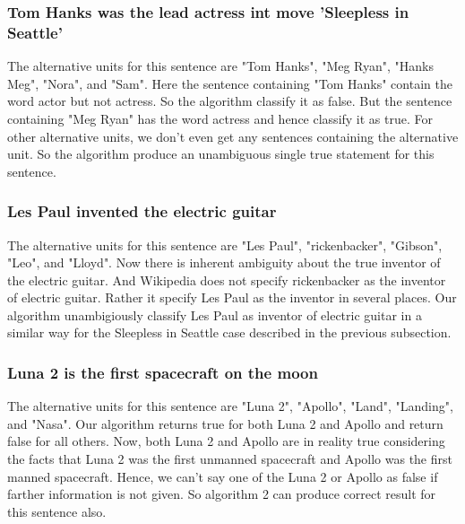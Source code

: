 \documentclass[11pt]{article}
\begin{document}
\subsubsection{Tom Hanks was the lead actress  int move 'Sleepless in Seattle'}
The alternative units for this sentence are "Tom Hanks", "Meg Ryan", "Hanks Meg", "Nora", and "Sam". Here the sentence containing "Tom Hanks" contain the word actor but not actress. So the algorithm classify it as false. But the sentence containing "Meg Ryan" has the word actress and hence classify it as true. For other alternative units, we don't even get any sentences containing the alternative unit. So the algorithm produce an unambiguous single true statement for this sentence.

\subsubsection{Les Paul invented the electric guitar}
The alternative units for this sentence are "Les Paul", "rickenbacker", "Gibson", "Leo", and "Lloyd". Now there is inherent ambiguity about the true inventor of the electric guitar. And Wikipedia does not specify rickenbacker as the inventor of electric guitar. Rather it specify Les Paul as the inventor in several places. Our algorithm unambigiously classify Les Paul as inventor of electric guitar in a similar way for the Sleepless in Seattle case described in the previous subsection. 

\subsubsection{Luna 2 is the first spacecraft on the moon}
The alternative units for this sentence are "Luna 2", "Apollo", "Land", "Landing", and "Nasa". Our algorithm returns true for both Luna 2 and Apollo and return false for all others. Now, both Luna 2 and Apollo are in reality true considering the facts that Luna 2 was the first unmanned spacecraft and Apollo was the first manned spacecraft. Hence, we can't say one of the Luna 2 or Apollo as false if farther information is not given. So algorithm 2 can produce correct result for this sentence also.
\end{document}
